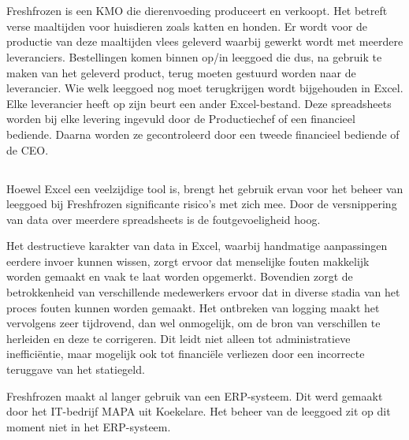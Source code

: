
\chapter{}%
\label{ch:inleiding}

Freshfrozen is een KMO die dierenvoeding produceert en verkoopt. Het betreft verse maaltijden voor huisdieren zoals katten en honden. Er wordt voor de productie van deze maaltijden vlees geleverd waarbij gewerkt wordt met meerdere leveranciers. Bestellingen komen binnen op/in leeggoed die dus, na gebruik te maken van het geleverd product, terug moeten gestuurd worden naar de leverancier. Wie welk leeggoed nog moet terugkrijgen wordt bijgehouden in Excel. Elke leverancier heeft op zijn beurt een ander Excel-bestand. Deze spreadsheets worden bij elke levering ingevuld door de Productiechef of een financieel bediende. Daarna worden ze gecontroleerd door een tweede financieel bediende of de CEO.

\section{}%
\label{sec:probleemstelling}

Hoewel Excel een veelzijdige tool is, brengt het gebruik ervan voor het beheer van leeggoed bij Freshfrozen significante risico's met zich mee. Door de versnippering van data over meerdere spreadsheets is de foutgevoeligheid hoog.

Het destructieve karakter van data in Excel, waarbij handmatige aanpassingen eerdere invoer kunnen wissen, zorgt ervoor dat menselijke fouten makkelijk worden gemaakt en vaak te laat worden opgemerkt. Bovendien zorgt de betrokkenheid van verschillende medewerkers ervoor dat in diverse stadia van het proces fouten kunnen worden gemaakt. Het ontbreken van logging maakt het vervolgens zeer tijdrovend, dan wel onmogelijk, om de bron van verschillen te herleiden en deze te corrigeren. Dit leidt niet alleen tot administratieve inefficiëntie, maar mogelijk ook tot financiële verliezen door een incorrecte teruggave van het statiegeld.

Freshfrozen maakt al langer gebruik van een ERP-systeem. Dit werd gemaakt door het IT-bedrijf MAPA uit Koekelare. Het beheer van de leeggoed zit op dit moment niet in het ERP-systeem.

